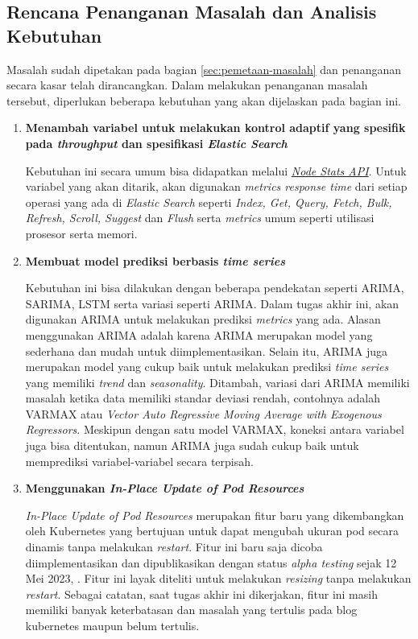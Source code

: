 \subsection{Rencana Penanganan Masalah dan Analisis Kebutuhan}

Masalah sudah dipetakan pada bagian \ref{sec:pemetaan-masalah} dan penanganan secara kasar telah dirancangkan. Dalam melakukan penanganan masalah tersebut, diperlukan beberapa kebutuhan yang akan dijelaskan pada bagian ini.

\begin{enumerate}
    \item \textbf{Menambah variabel untuk melakukan kontrol adaptif yang spesifik pada \textit{throughput} dan spesifikasi \textit{Elastic Search}}
    
    Kebutuhan ini secara umum bisa didapatkan melalui \href{https://www.elastic.co/guide/en/elasticsearch/reference/current/cluster-nodes-stats.html}{\textit{Node Stats API}}. Untuk variabel yang akan ditarik, akan digunakan \textit{metrics response time} dari setiap operasi yang ada di \textit{Elastic Search} seperti \textit{Index, Get, Query, Fetch, Bulk, Refresh, Scroll, Suggest} dan \textit{Flush} serta \textit{metrics} umum seperti utilisasi prosesor serta memori.

    \item \textbf{Membuat model prediksi berbasis \textit{time series}}
    
    Kebutuhan ini bisa dilakukan dengan beberapa pendekatan seperti ARIMA, SARIMA, LSTM serta variasi seperti ARIMA. Dalam tugas akhir ini, akan digunakan ARIMA untuk melakukan prediksi \textit{metrics} yang ada. Alasan menggunakan ARIMA adalah karena ARIMA merupakan model yang sederhana dan mudah untuk diimplementasikan. Selain itu, ARIMA juga merupakan model yang cukup baik untuk melakukan prediksi \textit{time series} yang memiliki \textit{trend} dan \textit{seasonality}. Ditambah, variasi dari ARIMA memiliki masalah ketika data memiliki standar deviasi rendah, contohnya adalah VARMAX atau \textit{Vector Auto Regressive Moving Average with Exogenous Regressors}. Meskipun dengan satu model VARMAX, koneksi antara variabel juga bisa ditentukan, namun ARIMA juga sudah cukup baik untuk memprediksi variabel-variabel secara terpisah.

    \item \textbf{Menggunakan \textit{In-Place Update of Pod Resources}}

    \textit{In-Place Update of Pod Resources} merupakan fitur baru yang dikembangkan oleh Kubernetes yang bertujuan untuk dapat mengubah ukuran pod secara dinamis tanpa melakukan \textit{restart}. Fitur ini baru saja dicoba diimplementasikan dan dipublikasikan dengan status \textit{alpha testing} sejak 12 Mei 2023, \parencite{kubeinplaceupdate}. Fitur ini layak diteliti untuk melakukan \textit{resizing} tanpa melakukan \textit{restart}. Sebagai catatan, saat tugas akhir ini dikerjakan, fitur ini masih memiliki banyak keterbatasan dan masalah yang tertulis pada blog kubernetes maupun belum tertulis.


\end{enumerate}
